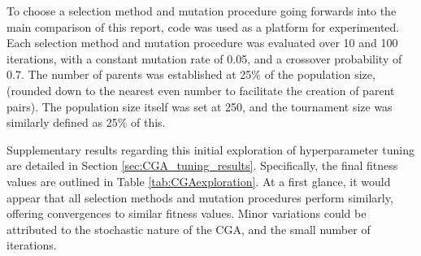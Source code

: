 \documentclass[10pt]{article}
\begin{document}
\begin{multicols}{2}
To choose a selection method and mutation procedure going forwards into the main comparison of this report, code %
was used as a platform for experimented. Each selection method and mutation procedure was evaluated over 10 and 100 iterations, with a constant mutation rate of 0.05, and a crossover probability of 0.7. The number of parents was established at 25\% of the population size, (rounded down to the nearest even number to facilitate the creation of parent pairs). The population size itself was set at 250, and the tournament size was similarly defined as 25\% of this.

Supplementary results regarding this initial exploration of hyperparameter tuning are detailed in Section \ref{sec:CGA_tuning_results}. Specifically, the final fitness values are outlined in Table \ref{tab:CGAexploration}. At a first glance, it would appear that all selection methods and mutation procedures perform similarly, offering convergences to similar fitness values. Minor variations could be attributed to the stochastic nature of the CGA, and the small number of iterations.


\end{multicols}
\end{document}
